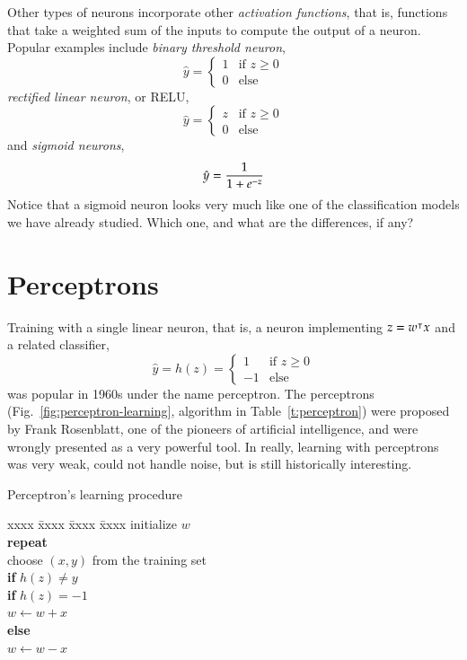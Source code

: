 \begin{refsection}
Other types of neurons incorporate other {\em activation functions}, that is, functions that take a weighted sum of the inputs to compute the output of a neuron. Popular examples include {\em binary threshold neuron},
\begin{equation}
\hat{y} = 
\begin{cases}
1 & \text{if } z\geq 0 \\
0 & \text{else}
\end{cases}
\end{equation}
{\em rectified linear neuron}, or RELU,
\begin{equation}
\hat{y} = 
\begin{cases}
z & \text{if } z\geq 0 \\
0 & \text{else}
\end{cases}
\end{equation}
and {\em sigmoid neurons},
\begin{equation}
\hat{y}={1\over 1+e^{-z}}
\end{equation}
Notice that a sigmoid neuron looks very much like one of the classification models we have already studied. Which one, and what are the differences, if any?

\section{Perceptrons}

Training with a single linear neuron, that is, a neuron implementing $z=w^\intercal x$ and a related classifier, 
\begin{equation}
\hat{y} = h(z) =
\begin{cases}
1 & \text{if } z\geq 0 \\
-1 & \text{else}
\end{cases}
\end{equation}
was popular in 1960s under the name perceptron. The perceptrons (Fig.~\ref{fig:perceptron-learning}, algorithm in Table~\ref{t:perceptron}) were proposed by Frank Rosenblatt, one of the pioneers of artificial intelligence, and were wrongly presented as a very powerful tool. In really, learning with perceptrons was very weak, could not handle noise, but is still historically interesting. 

\begin{table}[htbp]
\caption{Perceptron's learning procedure}
\begin{tabbing}
xxxx \= xxxx \= xxxx \= xxxx \kill
initialize $w$ \\
{\bf repeat} \\
\> choose $(x, y)$ from the training set \\
\> {\bf if} $h(z) \neq y$ \\
\> \> {\bf if} $h(z)=-1$ \\
\> \> \> $w\leftarrow w+x$ \\
\> \> {\bf else} \\
\> \> \> $w\leftarrow w-x$ \\
\end{tabbing}
\label{t:perceptron}
\end{table}


\end{refsection}
